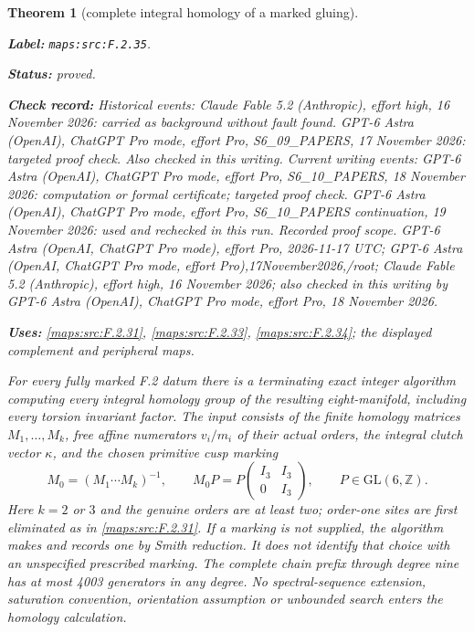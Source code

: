 \documentclass[11pt,a4paper]{article}
\newtheorem{theorem}{Theorem}[section]
\theoremstyle{definition}
\newcommand{\StatementRecord}[4]{\par\smallskip\begingroup\upshape\raggedright\noindent\textbf{Label:} \nolinkurl{#1}.\par\noindent\textbf{Status:} #2.\par\noindent\textbf{Check record:} #3.\par\noindent\textbf{Uses:} #4.\par\endgroup\smallskip}
\begin{document}
\begin{theorem}[complete integral homology of a marked gluing]\label{maps:src:F.2.35}
\StatementRecord{maps:src:F.2.35}{proved}{Historical events: Claude Fable 5.2 (Anthropic), effort high, 16 November 2026: carried as background without fault found. GPT-6 Astra (OpenAI), ChatGPT Pro mode, effort Pro, S6\_09\_PAPERS, 17 November 2026: targeted proof check. Also checked in this writing. Current writing events: GPT-6 Astra (OpenAI), ChatGPT Pro mode, effort Pro, S6\_10\_PAPERS, 18 November 2026: computation or formal certificate; targeted proof check. GPT-6 Astra (OpenAI), ChatGPT Pro mode, effort Pro, S6\_10\_PAPERS continuation, 19 November 2026: used and rechecked in this run. \emph{Recorded proof scope.} GPT-6 Astra (OpenAI, ChatGPT Pro mode), effort Pro, 2026-11-17 UTC; GPT-6 Astra (OpenAI, ChatGPT Pro mode, effort Pro),17November2026,/root; Claude Fable 5.2 (Anthropic), effort high, 16 November 2026; also checked in this writing by GPT-6 Astra (OpenAI), ChatGPT Pro mode, effort Pro, 18 November 2026}{\cref{maps:src:F.2.31}, \cref{maps:src:F.2.33}, \cref{maps:src:F.2.34}; the displayed complement and peripheral maps}


For every fully marked F.2 datum there is a terminating exact
integer algorithm computing every integral homology group of
the resulting eight-manifold, including every torsion invariant
factor.  The input consists of the finite homology matrices
$M_1,\ldots,M_k$, free affine numerators $v_i/m_i$ of their
actual orders, the integral clutch vector $\kappa$, and the
chosen primitive cusp marking
\[
 M_0=(M_1\cdots M_k)^{-1},\qquad
 M_0P=P\begin{pmatrix}I_3&I_3\\0&I_3\end{pmatrix},
 \qquad P\in\mathrm{GL}(6,\mathbb Z).                       \tag{F.GC1}\label{maps:eq:F.GC1}
\]
Here $k=2$ or $3$ and the genuine orders are at least two;
order-one sites are first eliminated as in \ref{maps:src:F.2.31}.
If a marking is not supplied, the algorithm makes and records
one by Smith reduction.  It does not identify that choice
with an unspecified prescribed marking.
The complete chain prefix through degree nine has at most
4003 generators in any degree.  No spectral-sequence
extension, saturation convention, orientation assumption or
unbounded search enters the homology calculation.

\end{theorem}
\end{document}
